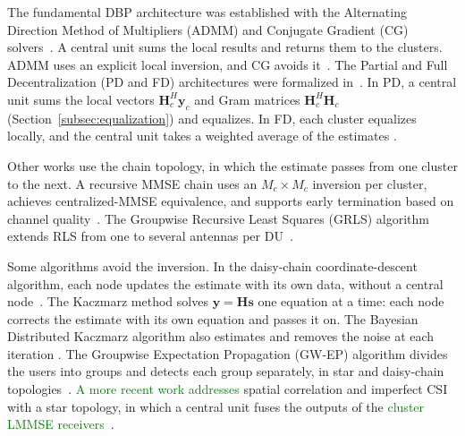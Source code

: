 The fundamental DBP architecture was established with the Alternating Direction
Method of Multipliers (ADMM) and Conjugate Gradient (CG) solvers~\cite{decentralized2017}. A central unit sums the local results and returns them to the clusters. ADMM uses an explicit local inversion, and CG avoids it~\cite{decentralized2017}.
The Partial and Full Decentralization (PD and FD) architectures were formalized
in~\cite{jeon2019}. In PD, a central unit sums the local vectors $\mathbf H_c^H\mathbf y_c$ and Gram matrices $\mathbf H_c^H\mathbf H_c$ (Section~\ref{subsec:equalization}) and equalizes. In FD, each cluster equalizes locally, and the central unit takes a weighted average of the estimates \cite{jeon2019}.

Other works use the chain topology, in which the estimate passes from one cluster to the next. A recursive MMSE chain
uses an $M_c \times M_c$ inversion per cluster, achieves
centralized-MMSE equivalence, and supports early termination based on channel quality~\cite{zheng2022}. The Groupwise Recursive Least Squares (GRLS) algorithm extends RLS from one to several antennas per DU~\cite{chen2024grls}.

Some algorithms avoid the inversion.
In the daisy-chain coordinate-descent algorithm, each node updates the estimate with its own data, without a central node~\cite{rodriguezsanchez2020}. The Kaczmarz method solves $\mathbf y = \mathbf H\mathbf s$ one equation at a time: each node corrects the estimate with its own equation and passes it on. The Bayesian Distributed Kaczmarz algorithm also estimates and removes the noise at each iteration \cite{croisfelt2021}.
The Groupwise Expectation Propagation (GW-EP) algorithm divides the users into groups and detects each group separately, in star and daisy-chain topologies~\cite{li2023iotj}.
\textcolor{GREEN}{A more recent work addresses} spatial correlation and imperfect CSI with a star topology, in which a central unit fuses the outputs of the \textcolor{GREEN}{cluster LMMSE receivers}~\cite{zhuang2025}.


